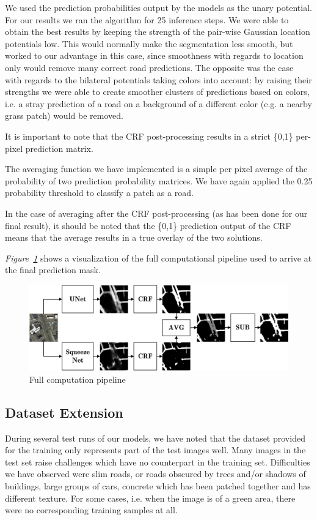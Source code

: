 \documentclass[10pt,conference,compsocconf]{IEEEtran}
\begin{document}
We used the prediction probabilities output by the models as the unary potential. For our results we ran the algorithm for 25 inference steps. We were able to obtain the best results by keeping the strength of the pair-wise Gaussian location potentials low. This would normally make the segmentation less smooth, but worked to our advantage in this case, since smoothness with regards to location only would remove many correct road predictions. The opposite was the case with regards to the bilateral potentials taking colors into account: by raising their strengths we were able to create smoother clusters of predictions based on colors, i.e. a stray prediction of a road on a background of a different color (e.g. a nearby grass patch) would be removed. 

It is important to note that the CRF post-processing results in a strict \{0,1\} per-pixel prediction matrix.

The averaging function we have implemented is a simple per pixel average of the probability of two prediction probability matrices. We have again applied the 0.25 probability threshold to classify a patch as a road.

In the case of averaging after the CRF post-processing (as has been done for our final result), it should be noted that the \{0,1\} prediction output of the CRF means that the average results in a true overlay of the two solutions. 

\textit{Figure~\ref{fig:pred-pipeline}} shows a visualization of the full computational pipeline used to arrive at the final prediction mask.

\begin{figure}[ht]
\centering
    \includegraphics[width=\columnwidth]{images/best_result.pdf}
    \captionsetup{justification=centering}
    \caption{Full computation pipeline}
    \label{fig:pred-pipeline}
\end{figure}

\subsection{Dataset Extension}
\label{sec:dataset-extension}
During several test runs of our models, we have noted that the dataset provided for the training only represents part of the test images well. Many images in the test set raise challenges which have no counterpart in the training set. Difficulties we have observed were slim roads, or roads obscured by trees and/or shadows of buildings, large groups of cars, concrete which has been patched together and has different texture. For some cases, i.e. when the image is of a green area, there were no corresponding training samples at all.
\end{document}
